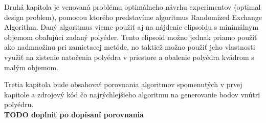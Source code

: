 Druhá kapitola je venovaná problému optimálneho návrhu experimentov (optimal design problem), pomocou ktorého predstavíme algoritmus Randomized Exchange Algorithm. Daný algoritmus vieme použiť aj na nájdenie elipsoidu s minimálnym objemom obaľujúci zadaný polyéder. Tento elipsoid možno jednak priamo použiť ako nadmnožinu pri zamietacej metóde, no taktiež možno použiť jeho vlastnosti využiť na zistenie natočenia polyédra v priestore a obalenie polyédra kvádrom s malým objemom.

Tretia kapitola bude obsahovať porovnania algoritmov spomenutých v prvej kapitole a zdrojový kód čo najrýchlejšieho algoritmu na generovanie bodov vnútri polyédru. \\

\textbf{TODO doplniť po dopísaní porovnania}
